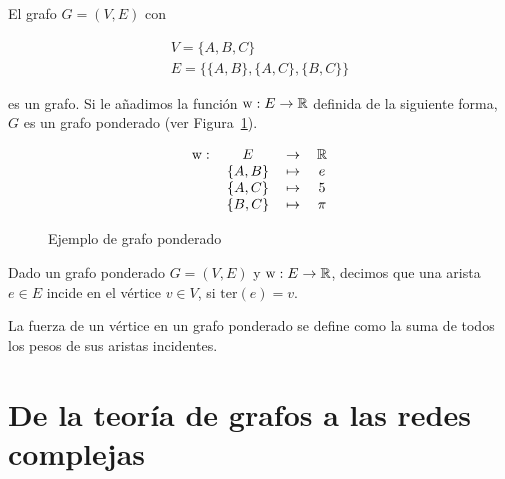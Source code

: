 \begin{ejemplo}
	El grafo $G = (V,E)$ con 
	
	\begin{eqnarray}
	V = \{A, B, C\}\\
	E = \{ \{A,B\}, \{A,C\}, \{B,C\} \}
	\end{eqnarray} 
	
	es un grafo. Si le añadimos la función $\mathrm{w} : E \to \mathbb{R}$ definida de la siguiente forma, $G$ es un grafo ponderado (ver Figura~\ref{fig:grafo_ponderado}).
	
	\begin{equation*}
	\begin{tabular}{r c c c}
	$\mathrm{w}:$ & $E$ & $\to$ & $\R$\\
	& $\{A,B\}$ & $\mapsto$ & $e$\\
	& $\{A,C\}$ & $\mapsto$ & $5$\\
	& $\{B,C\}$ & $\mapsto$ & $\pi$
	
	\end{tabular}
	\end{equation*}
	\begin{figure}[htb]
		\centering
		\ejemplografoponderado
		\caption{Ejemplo de grafo ponderado}
		\label{fig:grafo_ponderado}
	\end{figure} 
\end{ejemplo}

\begin{defi}
	Dado un grafo ponderado $G = (V,E)$ y $\mathrm{w} : E \to \mathbb{R}$, decimos que una arista $e \in E$ incide en el vértice $v \in V$, si $\mathrm{ter}(e) = v$. 
\end{defi}

\begin{defi}
	La fuerza de un vértice en un grafo ponderado se define como la suma de todos los pesos de sus aristas incidentes.
\end{defi}


\section{De la teoría de grafos a las redes complejas}\label{sec:redes_complejas}

